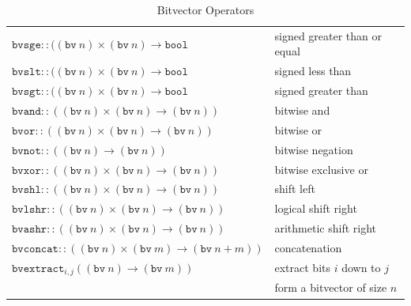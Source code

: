 \documentclass[11pt,twoside,fleqn,openright,titlepage]{cslreport}
\begin{document}
\begin{table}
\begin{tabular}{|l|l|}
$\mathtt{bvsge}::((\mathtt{bv}\ n)\times (\mathtt{bv}\ n) \rightarrow \mathtt{bool}$ &
signed greater than or equal\\
$\mathtt{bvslt}::((\mathtt{bv}\ n)\times (\mathtt{bv}\ n) \rightarrow \mathtt{bool}$ &
signed less than\\
$\mathtt{bvsgt}::((\mathtt{bv}\ n)\times (\mathtt{bv}\ n) \rightarrow \mathtt{bool}$ &
signed greater than\\
\hline
$\mathtt{bvand}::((\mathtt{bv}\ n)\times (\mathtt{bv}\ n) \rightarrow (\mathtt{bv}\ n))$ &
bitwise and\\
$\mathtt{bvor}::((\mathtt{bv}\ n)\times (\mathtt{bv}\ n) \rightarrow (\mathtt{bv}\ n))$ &
bitwise or\\
$\mathtt{bvnot}::((\mathtt{bv}\ n) \rightarrow (\mathtt{bv}\ n))$ &
bitwise negation\\
$\mathtt{bvxor}::((\mathtt{bv}\ n)\times (\mathtt{bv}\ n) \rightarrow (\mathtt{bv}\ n))$ &
bitwise exclusive or\\
\hline
$\mathtt{bvshl}::((\mathtt{bv}\ n)\times (\mathtt{bv}\ n) \rightarrow (\mathtt{bv}\ n))$ &
shift left\\
$\mathtt{bvlshr}::((\mathtt{bv}\ n)\times (\mathtt{bv}\ n) \rightarrow (\mathtt{bv}\ n))$ &
logical shift right\\
$\mathtt{bvashr}::((\mathtt{bv}\ n)\times (\mathtt{bv}\ n) \rightarrow (\mathtt{bv}\ n))$ &
arithmetic shift right\\
\hline
$\mathtt{bvconcat}::((\mathtt{bv}\ n)\times (\mathtt{bv}\ m) \rightarrow (\mathtt{bv}\ n+m))$ &
concatenation \\
$\mathtt{bvextract}_{i,j}$$((\mathtt{bv}\ n) \rightarrow (\mathtt{bv}\ m))$ &
extract bits $i$ down to $j$ \\
& form a bitvector of size $n$ \\
\hline
\end{tabular}
\caption{Bitvector Operators}
\label{bitvectors}
\end{table}
\end{document}
